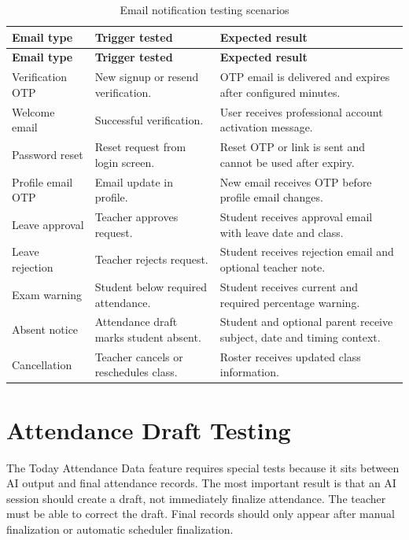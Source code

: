 \begin{longtable}{p{3.4cm} p{4.6cm} p{5.5cm}}
\caption{Email notification testing scenarios}
\label{tab:email-test-scenarios}\\
\toprule
\textbf{Email type} & \textbf{Trigger tested} & \textbf{Expected result}\\
\midrule
\endfirsthead
\toprule
\textbf{Email type} & \textbf{Trigger tested} & \textbf{Expected result}\\
\midrule
\endhead
Verification OTP & New signup or resend verification. & OTP email is delivered and expires after configured minutes.\\
Welcome email & Successful verification. & User receives professional account activation message.\\
Password reset & Reset request from login screen. & Reset OTP or link is sent and cannot be used after expiry.\\
Profile email OTP & Email update in profile. & New email receives OTP before profile email changes.\\
Leave approval & Teacher approves request. & Student receives approval email with leave date and class.\\
Leave rejection & Teacher rejects request. & Student receives rejection email and optional teacher note.\\
Exam warning & Student below required attendance. & Student receives current and required percentage warning.\\
Absent notice & Attendance draft marks student absent. & Student and optional parent receive subject, date and timing context.\\
Cancellation & Teacher cancels or reschedules class. & Roster receives updated class information.\\
\bottomrule
\end{longtable}

\section{Attendance Draft Testing}

The Today Attendance Data feature requires special tests because it sits between AI output and final attendance records. The most important result is that an AI session should create a draft, not immediately finalize attendance. The teacher must be able to correct the draft. Final records should only appear after manual finalization or automatic scheduler finalization.

